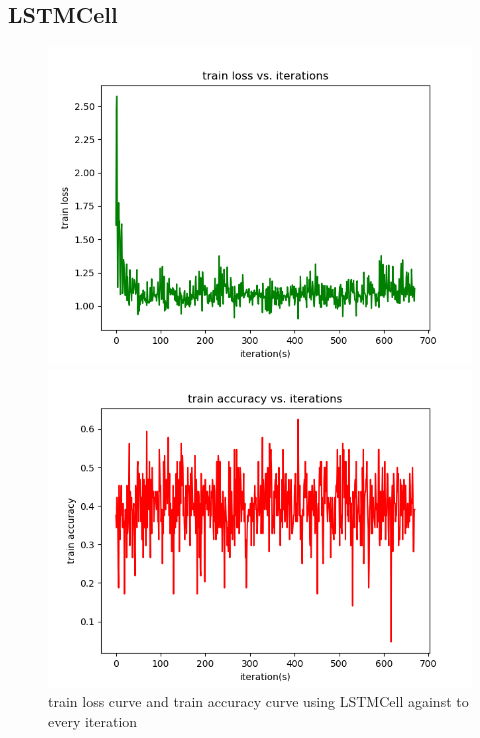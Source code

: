 \documentclass{elegantbook}
\begin{document}
\subsection{LSTMCell}
\begin{figure}[!h]
	\centering
	\begin{minipage}[t]{0.48\textwidth}
		\centering
		\includegraphics[width=\textwidth]{../codes/trainlosslstmcell}
	\end{minipage}
	\begin{minipage}[t]{0.48\textwidth}
		\centering
		\includegraphics[width=\textwidth]{../codes/trainacclstmcell}
	\end{minipage}
	\caption{\label{trainres13}train loss curve and train accuracy curve using LSTMCell against to every iteration}
\end{figure}
\end{document}
